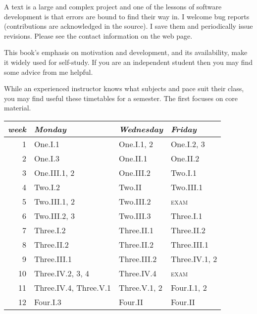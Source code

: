 {A text is a large and complex project and one of the lessons of software
development is that errors are bound to find their way in.
I welcome bug reports
(contributions are acknowledged in the source).
I save them and periodically issue revisions.
Please see the contact information on the web page.


\newcommand{\classday}[1]{\textsc{#1}}
\newcommand{\colwidth}{1.25in}

\medskip
{}
%
This book's emphasis on motivation and development,
and its availability, make it widely used for self-study.
If you are an independent student 
then you may find some advice from me helpful.

While an experienced instructor knows what subjects and
pace suit their class, you may find useful these
timetables for a semester.
The first focuses on core material.
\begin{center} \small
   \begin{tabular}{r|*{2}{p{\colwidth}}l}
      \textit{week}  
       &\textit{Monday}          
       &\textit{Wednesday}            
       &\textit{Friday}        \\ \hline
       1    &One.I.1         &One.I.1, 2        &One.I.2, 3         \\
       2    &One.I.3         &One.II.1          &One.II.2         \\
       3    &One.III.1, 2    &One.III.2         &Two.I.1         \\
       4    &Two.I.2         &Two.II            &Two.III.1         \\
       5    &Two.III.1, 2    &Two.III.2         &\classday{exam}          \\
       6    &Two.III.2, 3    &Two.III.3         &Three.I.1        \\
       7    &Three.I.2         &Three.II.1          &Three.II.2         \\
       8    &Three.II.2        &Three.II.2          &Three.III.1          \\
       9    &Three.III.1       &Three.III.2         &Three.IV.1, 2       \\
      10    &Three.IV.2, 3, 4  &Three.IV.4          &\classday{exam}          \\
      11    &Three.IV.4, Three.V.1 &Three.V.1, 2        &Four.I.1, 2         \\
      12    &Four.I.3         &Four.II            &Four.II       \\

\end{tabular}
\end{center}}
